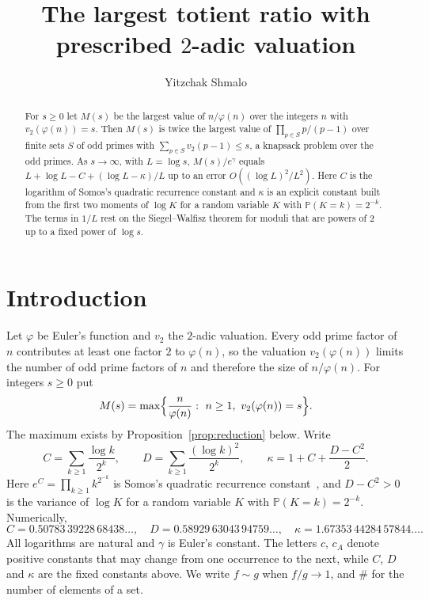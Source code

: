 \documentclass[11pt]{amsart}
\theoremstyle{remark}
\numberwithin{equation}{section}
\newcommand{\PP}{\mathbb{P}}
\begin{document}
\title[Totient ratio with prescribed 2-adic valuation]{The largest totient ratio with prescribed $2$-adic valuation}
\author{Yitzchak Shmalo}
\address{Einstein Institute of Mathematics, The Hebrew University of Jerusalem, Jerusalem, Israel}
\date{}

\begin{abstract}
For $s\ge0$ let $M(s)$ be the largest value of $n/\varphi(n)$ over the
integers $n$ with $v_2(\varphi(n))=s$. Then $M(s)$ is twice the largest
value of $\prod_{p\in S}p/(p-1)$ over finite sets $S$ of odd primes with
$\sum_{p\in S}v_2(p-1)\le s$, a knapsack problem over the odd primes. As
$s\to\infty$, with $L=\log s$, $M(s)/e^{\gamma}$ equals
$L+\log L-C+(\log L-\kappa)/L$ up to an error $O((\log L)^2/L^2)$. Here
$C$ is the logarithm of Somos's quadratic recurrence constant and
$\kappa$ is an explicit constant built from the first two moments of
$\log K$ for a random variable $K$ with $\PP(K=k)=2^{-k}$. The terms in $1/L$ rest on
the Siegel--Walfisz theorem for moduli that are powers of $2$ up to a
fixed power of $\log s$.
\end{abstract}

\maketitle

\section{Introduction}

Let $\varphi$ be Euler's function and $v_2$ the $2$-adic valuation. Every
odd prime factor of $n$ contributes at least one factor $2$ to
$\varphi(n)$, so the valuation $v_2(\varphi(n))$ limits the number of odd
prime factors of $n$ and therefore the size of $n/\varphi(n)$. For
integers $s\ge0$ put
\[
M(s)=\max\Bigl\{\frac{n}{\varphi(n)}:\ n\ge1,\ v_2(\varphi(n))=s\Bigr\}.
\]
The maximum exists by Proposition~\ref{prop:reduction} below. Write
\[
C=\sum_{k\ge1}\frac{\log k}{2^k},\qquad
D=\sum_{k\ge1}\frac{(\log k)^2}{2^k},\qquad
\kappa=1+C+\frac{D-C^2}{2}.
\]
Here $e^C=\prod_{k\ge1}k^{2^{-k}}$ is Somos's quadratic recurrence
constant~\cite{SH07}, and $D-C^2>0$ is the variance of $\log K$
for a random variable $K$ with $\PP(K=k)=2^{-k}$. Numerically,
\[
C=0.50783\,39228\,68438\ldots,\quad D=0.58929\,63043\,94759\ldots,\quad
\kappa=1.67353\,44284\,57844\ldots .
\]
All logarithms are natural and $\gamma$ is Euler's constant. The
letters $c$, $c_A$ denote positive constants that may change from one
occurrence to the next, while $C$, $D$ and $\kappa$ are the fixed
constants above. We write $f\sim g$ when $f/g\to1$, and $\#$ for the
number of elements of a set.
\end{document}
